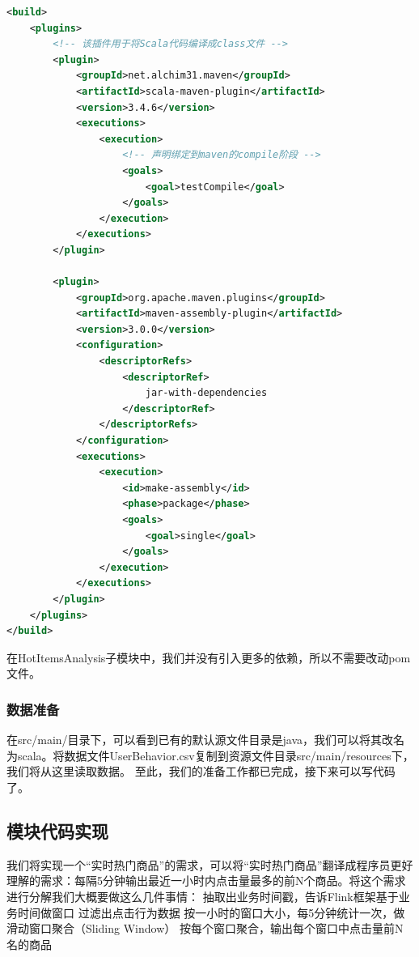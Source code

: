 \documentclass[oneside]{ctexbook}
\begin{document}
\begin{lstlisting}[language=xml, caption=UserBehaviorAnalysis/pom.xml]
<build>
    <plugins>
        <!-- 该插件用于将Scala代码编译成class文件 -->
        <plugin>
            <groupId>net.alchim31.maven</groupId>
            <artifactId>scala-maven-plugin</artifactId>
            <version>3.4.6</version>
            <executions>
                <execution>
                    <!-- 声明绑定到maven的compile阶段 -->
                    <goals>
                        <goal>testCompile</goal>
                    </goals>
                </execution>
            </executions>
        </plugin>

        <plugin>
            <groupId>org.apache.maven.plugins</groupId>
            <artifactId>maven-assembly-plugin</artifactId>
            <version>3.0.0</version>
            <configuration>
                <descriptorRefs>
                    <descriptorRef>
                        jar-with-dependencies
                    </descriptorRef>
                </descriptorRefs>
            </configuration>
            <executions>
                <execution>
                    <id>make-assembly</id>
                    <phase>package</phase>
                    <goals>
                        <goal>single</goal>
                    </goals>
                </execution>
            </executions>
        </plugin>
    </plugins>
</build>
\end{lstlisting}

在HotItemsAnalysis子模块中，我们并没有引入更多的依赖，所以不需要改动pom文件。

\subsubsection{数据准备}
在src/main/目录下，可以看到已有的默认源文件目录是java，我们可以将其改名为scala。将数据文件UserBehavior.csv复制到资源文件目录src/main/resources下，我们将从这里读取数据。
至此，我们的准备工作都已完成，接下来可以写代码了。

\subsection{模块代码实现}
我们将实现一个“实时热门商品”的需求，可以将“实时热门商品”翻译成程序员更好理解的需求：每隔5分钟输出最近一小时内点击量最多的前N个商品。将这个需求进行分解我们大概要做这么几件事情：
抽取出业务时间戳，告诉Flink框架基于业务时间做窗口
过滤出点击行为数据
按一小时的窗口大小，每5分钟统计一次，做滑动窗口聚合（Sliding Window）
按每个窗口聚合，输出每个窗口中点击量前N名的商品
\end{document}
